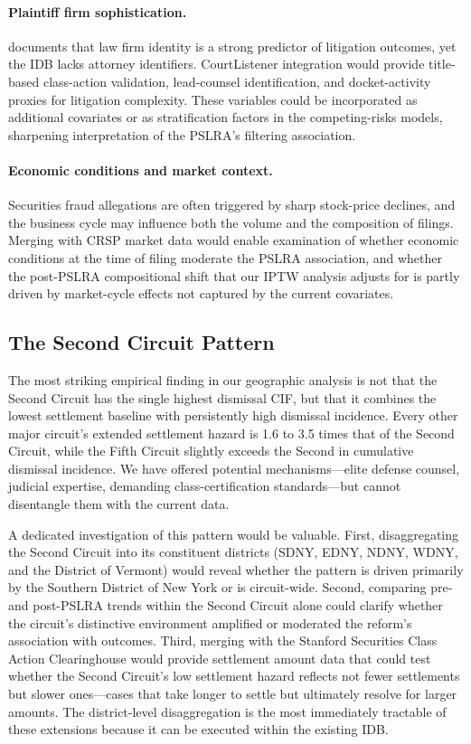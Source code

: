 \paragraph{Plaintiff firm sophistication.}
\citep{wang2022} documents that law firm identity is a
strong predictor of litigation outcomes, yet the IDB lacks
attorney identifiers. CourtListener integration would
provide title-based class-action validation, lead-counsel
identification, and docket-activity proxies for litigation
complexity. These variables could be incorporated as
additional covariates or as stratification factors in the
competing-risks models, sharpening interpretation of the
PSLRA's filtering association.

\paragraph{Economic conditions and market context.}
Securities fraud allegations are often triggered by sharp
stock-price declines, and the business cycle may influence
both the volume and the composition of filings. Merging with
CRSP market data would enable examination of whether
economic conditions at the time of filing moderate the PSLRA
association, and whether the post-PSLRA compositional shift
that our IPTW analysis adjusts for is partly driven by
market-cycle effects not captured by the current covariates.

\subsection{The Second Circuit Pattern}

The most striking empirical finding in our geographic
analysis is not that the Second Circuit has the single
highest dismissal CIF, but that it combines the lowest
settlement baseline with persistently high dismissal
incidence. Every other major circuit's extended settlement
hazard is 1.6 to 3.5 times that of the Second Circuit, while
the Fifth Circuit slightly exceeds the Second in cumulative
dismissal incidence. We have offered potential
mechanisms---elite defense counsel, judicial expertise,
demanding class-certification standards---but cannot
disentangle them with the current data.

A dedicated investigation of this pattern would be valuable.
First, disaggregating the Second Circuit into its
constituent districts (SDNY, EDNY, NDNY, WDNY, and the
District of Vermont) would reveal whether the pattern is
driven primarily by the Southern District of New York or is
circuit-wide. Second, comparing pre- and post-PSLRA trends
within the Second Circuit alone could clarify whether the
circuit's distinctive environment amplified or moderated the
reform's association with outcomes. Third, merging with the
Stanford Securities Class Action Clearinghouse would provide
settlement amount data that could test whether the Second
Circuit's low settlement hazard reflects not fewer
settlements but slower ones---cases that take longer to
settle but ultimately resolve for larger amounts.
The district-level disaggregation is the most immediately
tractable of these extensions because it can be executed
within the existing IDB.

